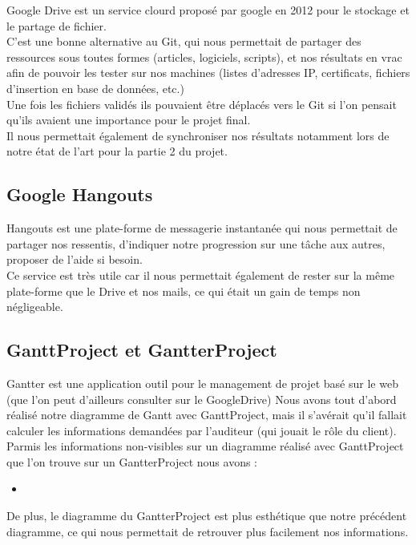 Google Drive est un service clourd proposé par google en 2012 pour le stockage et le partage de fichier.\\
C'est une bonne alternative au Git, qui nous permettait de partager des ressources sous toutes formes (articles, logiciels, scripts), et nos résultats en vrac afin de pouvoir les tester sur nos machines (listes d'adresses IP, certificats, fichiers d'insertion en base de données, etc.)\\
Une fois les fichiers validés ils pouvaient être déplacés vers le Git si l'on pensait qu'ils avaient une importance pour le projet final.\\
Il nous permettait également de synchroniser nos résultats notamment lors de notre état de l'art pour la partie 2 du projet.

\subsection{Google Hangouts}

Hangouts est une plate-forme de messagerie instantanée qui nous permettait de partager nos ressentis, d'indiquer notre progression sur une tâche aux autres, proposer de l'aide si besoin.\\
Ce service est très utile car il nous permettait également de rester sur la même plate-forme que le Drive et nos mails, ce qui était un gain de temps non négligeable.

\subsection{GanttProject et GantterProject}

Gantter est une application outil pour le management de projet basé sur le web (que l'on peut d'ailleurs consulter sur le GoogleDrive)
Nous avons tout d'abord réalisé notre diagramme de Gantt avec GanttProject, mais il s'avérait qu'il fallait calculer les informations demandées par l'auditeur (qui jouait le rôle du client).\\
Parmis les informations non-visibles sur un diagramme réalisé avec GanttProject que l'on trouve sur un GantterProject nous avons :
\begin{itemize}
\item
\end{itemize}

De plus, le diagramme du GantterProject est plus esthétique que notre précédent diagramme, ce qui nous permettait de retrouver plus facilement nos informations.

